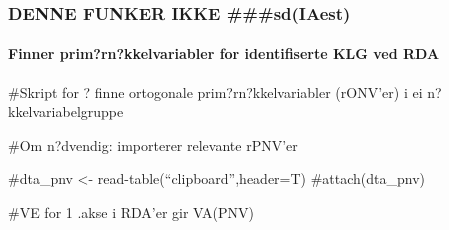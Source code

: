 \documentclass[]{article}
\newenvironment{Shaded}{\begin{snugshade}}{\end{snugshade}}
\newcommand{\KeywordTok}[1]{\textcolor[rgb]{0.13,0.29,0.53}{\textbf{#1}}}
\newcommand{\NormalTok}[1]{#1}
\newcommand{\OperatorTok}[1]{\textcolor[rgb]{0.81,0.36,0.00}{\textbf{#1}}}
\let\oldparagraph\paragraph
\renewcommand{\paragraph}[1]{\oldparagraph{#1}\mbox{}}
\begin{document}
\hypertarget{denne-funker-ikke-sdiaest}{%
\subsubsection{DENNE FUNKER IKKE
\#\#\#sd(IAest)}\label{denne-funker-ikke-sdiaest}}

\hypertarget{finner-primrnkkelvariabler-for-identifiserte-klg-ved-rda-1}{%
\paragraph{Finner prim?rn?kkelvariabler for identifiserte KLG ved
RDA}\label{finner-primrnkkelvariabler-for-identifiserte-klg-ved-rda-1}}

\#Skript for ? finne ortogonale prim?rn?kkelvariabler (rONV'er) i ei
n?kkelvariabelgruppe

\#Om n?dvendig: importerer relevante rPNV'er

\#dta\_pnv \textless{}- read-table(``clipboard'',header=T)
\#attach(dta\_pnv)

\#VE for 1 .akse i RDA'er gir VA(PNV)

\begin{Shaded}
\end{Shaded}
\end{document}
